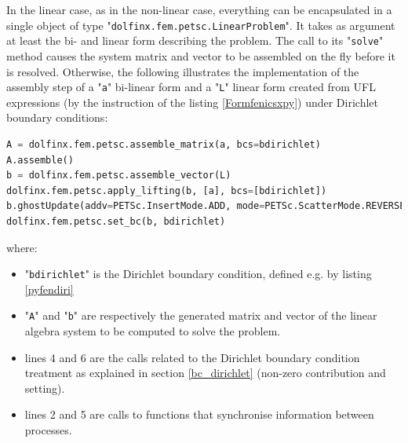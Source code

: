\documentclass[12pt]{article}
\newcommand{\mycode}[1]{\textsf{"}\lstinline`#1`\textsf{"}}
\newcommand{\mycodepy}[1]{\textsf{"}\lstinline[language=Python]`#1`\textsf{"}}
\begin{document}
In the linear case, as in the non-linear case, everything can be encapsulated in a single object of type \mycodepy{dolfinx.fem.petsc.LinearProblem}.
It takes as argument at least the bi- and linear form describing the problem.
The call to its \mycodepy{solve} method causes the system matrix and vector to be assembled on the fly before it is resolved. 
Otherwise, the following illustrates the implementation of the assembly step of a \mycodepy{a} bi-linear form and a \mycodepy{L} linear form created from UFL expressions (by the instruction of the listing \ref{Formfenicsxpy}) under Dirichlet boundary conditions: 
\begin{lstlisting}[basicstyle=\footnotesize,language=Python,label=asslinfen]
A = dolfinx.fem.petsc.assemble_matrix(a, bcs=bdirichlet)
A.assemble()
b = dolfinx.fem.petsc.assemble_vector(L)
dolfinx.fem.petsc.apply_lifting(b, [a], bcs=[bdirichlet])
b.ghostUpdate(addv=PETSc.InsertMode.ADD, mode=PETSc.ScatterMode.REVERSE)
dolfinx.fem.petsc.set_bc(b, bdirichlet)
\end{lstlisting}
where:
\begin{itemize}	
	\item \mycode{bdirichlet} is the Dirichlet boundary condition, defined e.g. by listing \ref{pyfendiri}
	\item \mycodepy{A} and \mycodepy{b} are respectively the generated matrix and vector of the linear algebra system to be computed to solve the problem.
	\item lines 4 and 6 are the calls related to the Dirichlet boundary condition treatment as explained in section \ref{bc_dirichlet} (non-zero contribution and setting).
	\item lines 2 and 5 are calls to functions that synchronise information between processes.
\end{itemize}
\end{document}
